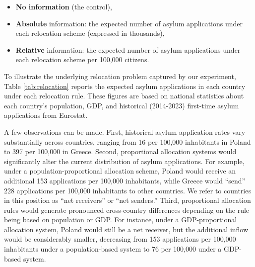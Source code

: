 \documentclass[
  12pt,
  a4paper,
]{article}
\providecommand{\tightlist}{%
  \setlength{\itemsep}{0pt}\setlength{\parskip}{0pt}}
\begin{document}
\begin{itemize}
\tightlist
\item
  \textbf{No information} (the control),
\item
  \textbf{Absolute} information: the expected number of asylum applications under each relocation scheme (expressed in thousands),
\item
  \textbf{Relative} information: the expected number of asylum applications under each relocation scheme per 100,000 citizens.
\end{itemize}

To illustrate the underlying relocation problem captured by our experiment, Table \ref{tab:relocation} reports the expected asylum applications in each country under each relocation rule. These figures are based on national statistics about each country's population, GDP, and historical (2014-2023) first-time asylum applications from Eurostat.

A few observations can be made. First, historical asylum application rates vary substantially across countries, ranging from 16 per 100,000 inhabitants in Poland to 397 per 100,000 in Greece. Second, proportional allocation systems would significantly alter the current distribution of asylum applications. For example, under a population-proportional allocation scheme, Poland would receive an additional 153 applications per 100,000 inhabitants, while Greece would ``send'' 228 applications per 100,000 inhabitants to other countries. We refer to countries in this position as ``net receivers'' or ``net senders.'' Third, proportional allocation rules would generate pronounced cross-country differences depending on the rule being based on population or GDP. For instance, under a GDP-proportional allocation system, Poland would still be a net receiver, but the additional inflow would be considerably smaller, decreasing from 153 applications per 100,000 inhabitants under a population-based system to 76 per 100,000 under a GDP-based system.
\end{document}
